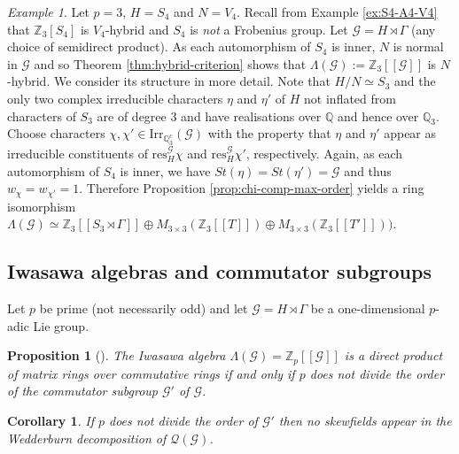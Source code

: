 \documentclass[12pt]{amsart}
\theoremstyle{plain}
\newtheorem{corollary}[theorem]{Corollary}
\newtheorem{prop}[theorem]{Proposition}
\theoremstyle{remark}
\newtheorem{example}[theorem]{Example}
\theoremstyle{definition}
\numberwithin{equation}{section}
\begin{document}
\begin{example}\label{ex:S4-V4}
Let $p=3$, $H=S_{4}$ and $N=V_{4}$.
Recall from Example \ref{ex:S4-A4-V4} that ${\mathbb{Z}}_{3}[S_{4}]$ is $V_{4}$-hybrid and $S_{4}$ is \emph{not} a Frobenius group.
Let $\mathcal{G} = H \rtimes \Gamma$ (any choice of semidirect product).
As each automorphism of $S_{4}$ is inner, $N$ is normal in $\mathcal{G}$
and so Theorem \ref{thm:hybrid-criterion} shows that $\Lambda(\mathcal{G}):={\mathbb{Z}}_{3}[[\mathcal{G}]]$ is $N$-hybrid.
We consider its structure in more detail.
Note that $H/N \simeq S_{3}$ and the only two complex irreducible characters $\eta$ and $\eta'$ of $H$
not inflated from characters of $S_{3}$ are of degree $3$ and have realisations over ${\mathbb{Q}}$ and hence over ${\mathbb{Q}}_{3}$.
Choose characters $\chi, \chi' \in {\mathrm{Irr}}_{{\mathbb{Q}}_{3}^{c}}(\mathcal{G})$ with the property that $\eta$ and $\eta'$ appear as irreducible constituents of ${\mathrm{res}}^{\mathcal{G}}_{H} \chi$ and ${\mathrm{res}}^{\mathcal{G}}_{H} \chi'$, respectively.
Again, as each automorphism of $S_{4}$ is inner, we have
$St(\eta) = St(\eta') = \mathcal{G}$ and thus $w_{\chi} = w_{\chi'} = 1$.
Therefore Proposition \ref{prop:chi-comp-max-order} yields a ring isomorphism
$\Lambda(\mathcal{G}) \simeq {\mathbb{Z}}_{3}[[S_{3} \rtimes \Gamma]] \oplus M_{3 \times 3}({\mathbb{Z}}_{3}[[T]]) \oplus  M_{3 \times 3}({\mathbb{Z}}_{3}[[T']]))$.
\end{example}

\subsection{Iwasawa algebras and commutator subgroups}
Let $p$ be prime (not necessarily odd) and let $\mathcal{G}=H \rtimes \Gamma$ be a one-dimensional $p$-adic Lie group.

\begin{prop}[{\cite[Proposition 4.5]{MR3092262}}]\label{prop:niceIwasawa-algebras}
The Iwasawa algebra $\Lambda(\mathcal{G})={\mathbb{Z}}_{p}[[\mathcal{G}]]$ is a direct product of matrix rings over commutative rings
if and only if $p$ does not divide the order of the commutator subgroup $\mathcal{G}'$ of $\mathcal{G}$.
\end{prop}

\begin{corollary}\label{cor:no-skewfields}
If $p$ does not divide the order of $\mathcal{G}'$ then no skewfields appear in the Wedderburn decomposition of $\mathcal{Q}(\mathcal{G})$.
\end{corollary}
\end{document}
